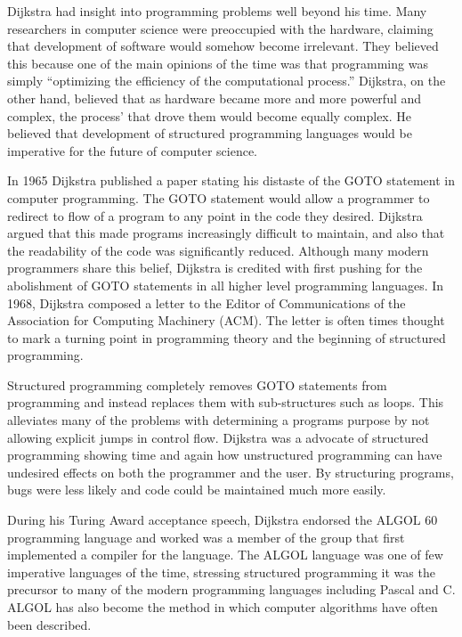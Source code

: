             Dijkstra had insight into programming problems well beyond his time. Many researchers in computer science were preoccupied with the hardware, claiming that development of software would somehow become irrelevant. They believed this because one of the main opinions of the time was that programming was simply “optimizing the efficiency of the computational process.” Dijkstra, on the other hand, believed that as hardware became more and more powerful and complex, the process' that drove them would become equally complex.  He believed that development of structured programming languages would be imperative for the future of computer science.

              In 1965 Dijkstra published a paper stating his distaste of the GOTO statement in computer programming.  The GOTO statement would allow a programmer to redirect to flow of a program to any point in the code they desired.  Dijkstra argued that this made programs increasingly difficult to maintain, and also that the readability of the code was significantly reduced.  Although many modern programmers share this belief, Dijkstra is credited with first pushing for the abolishment of GOTO statements in all higher level programming languages.  In 1968, Dijkstra composed a letter to the Editor of Communications of the Association for Computing Machinery (ACM).  The letter is often times thought to mark a turning point in programming theory and the beginning of structured programming.

                Structured programming completely removes GOTO statements from programming and instead replaces them with sub-structures such as loops.  This alleviates many of the problems with determining a programs purpose by not allowing explicit jumps in control flow.  Dijkstra was a advocate of structured programming showing time and again how unstructured programming can have undesired effects on both the programmer and the user.  By structuring programs, bugs were less likely and code could be maintained much more easily.

                  During his Turing Award acceptance speech, Dijkstra endorsed the ALGOL 60 programming language and worked was a member of the group that first implemented a compiler for the language.  The ALGOL language was one of few imperative languages of the time, stressing structured programming it was the precursor to many of the modern programming languages including Pascal and C.  ALGOL has also become the method in which computer algorithms have often been described.

